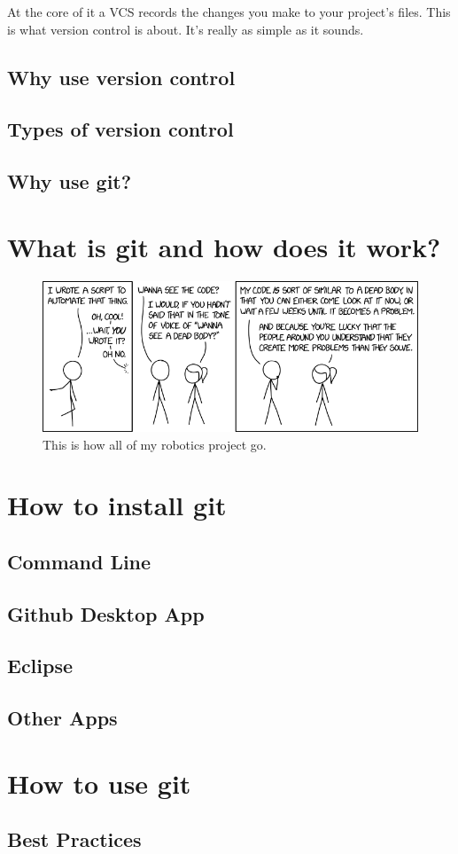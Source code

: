 \documentclass{article}
\begin{document}
    At the core of it a VCS records the changes you make to your project's files. This is what version control is about. It's really as simple as it sounds.
\subsection{Why use version control}

\subsection{Types of version control}
\subsection{Why use git?}
\section{What is git and how does it work?}
\newpage{}
\thispagestyle {empty}

\vspace*{2cm}

\begin{figure}
		\includegraphics[width=5.5in]{images/wanna_see_the_code.png}
		\caption{This is how all of my robotics project go.}
\end{figure}

\section{How to install git}
\subsection{Command Line}
\subsection{Github Desktop App}
\subsection{Eclipse}
\subsection{Other Apps}

\section{How to use git}
\subsection{Best Practices}


\printindex

\end{document}
